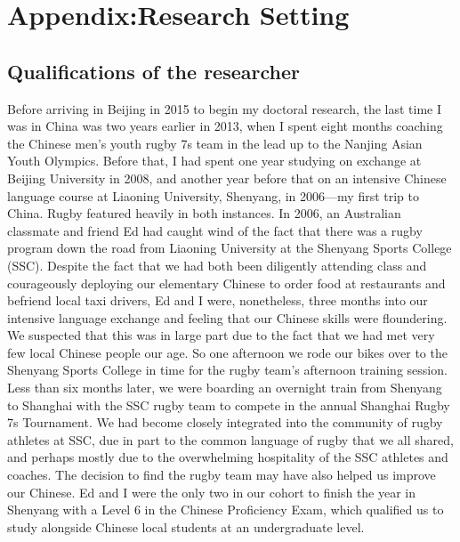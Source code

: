 \chapter{Appendix:Research Setting \label{app3:researchSetting}}

\begin{CJK}{UTF8}{gbsn}







  \section{Qualifications of the researcher\label{app3:qualPositionResearch}}

  Before arriving in Beijing in 2015 to begin my doctoral research, the last time I was in China was two years earlier in 2013, when I spent eight months coaching the Chinese men's youth rugby 7s team in the lead up to the Nanjing Asian Youth Olympics.  Before that, I had spent one year studying on exchange at Beijing University in 2008, and another year before that on an intensive Chinese language course at Liaoning University, Shenyang, in 2006---my first trip to China.  Rugby featured heavily in both instances.  In 2006, an Australian classmate and friend Ed had caught wind of the fact that there was a rugby program down the road from Liaoning University at the Shenyang Sports College (SSC).  Despite the fact that we had both been diligently attending class and courageously deploying our elementary Chinese to order food at restaurants and befriend local taxi drivers, Ed and I were, nonetheless, three months into our intensive language exchange and feeling that our Chinese skills were floundering.  We suspected that this was in large part due to the fact that we had met very few local Chinese people our age.  So one afternoon we rode our bikes over to the Shenyang Sports College in time for the rugby team's afternoon training session.  Less than six months later, we were boarding an overnight train from Shenyang to Shanghai with the SSC rugby team to compete in the annual Shanghai Rugby 7s Tournament.  We had become closely integrated into the community of rugby athletes at SSC, due in part to the common language of rugby that we all shared, and perhaps mostly due to the overwhelming hospitality of the SSC athletes and coaches.  The decision to find the rugby team may have also helped us improve our Chinese. Ed and I were the only two in our cohort to finish the year in Shenyang with a Level 6 in the Chinese Proficiency Exam, which qualified us to study alongside Chinese local students at an undergraduate level.


\end{CJK}
